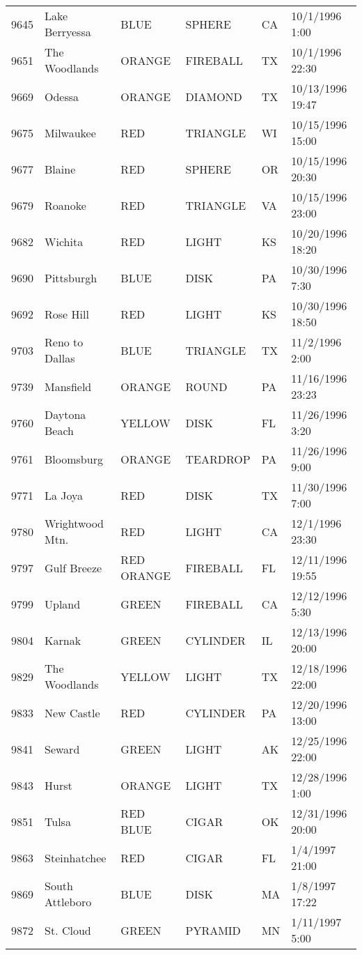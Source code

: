 \begin{tabular}{llllll}
9645 & Lake Berryessa & BLUE & SPHERE & CA & 10/1/1996 1:00 \\
9651 & The Woodlands & ORANGE & FIREBALL & TX & 10/1/1996 22:30 \\
9669 & Odessa & ORANGE & DIAMOND & TX & 10/13/1996 19:47 \\
9675 & Milwaukee & RED & TRIANGLE & WI & 10/15/1996 15:00 \\
9677 & Blaine & RED & SPHERE & OR & 10/15/1996 20:30 \\
9679 & Roanoke & RED & TRIANGLE & VA & 10/15/1996 23:00 \\
9682 & Wichita & RED & LIGHT & KS & 10/20/1996 18:20 \\
9690 & Pittsburgh & BLUE & DISK & PA & 10/30/1996 7:30 \\
9692 & Rose Hill & RED & LIGHT & KS & 10/30/1996 18:50 \\
9703 & Reno to Dallas & BLUE & TRIANGLE & TX & 11/2/1996 2:00 \\
9739 & Mansfield & ORANGE & ROUND & PA & 11/16/1996 23:23 \\
9760 & Daytona Beach & YELLOW & DISK & FL & 11/26/1996 3:20 \\
9761 & Bloomsburg & ORANGE & TEARDROP & PA & 11/26/1996 9:00 \\
9771 & La Joya & RED & DISK & TX & 11/30/1996 7:00 \\
9780 & Wrightwood Mtn. & RED & LIGHT & CA & 12/1/1996 23:30 \\
9797 & Gulf Breeze & RED ORANGE & FIREBALL & FL & 12/11/1996 19:55 \\
9799 & Upland & GREEN & FIREBALL & CA & 12/12/1996 5:30 \\
9804 & Karnak & GREEN & CYLINDER & IL & 12/13/1996 20:00 \\
9829 & The Woodlands & YELLOW & LIGHT & TX & 12/18/1996 22:00 \\
9833 & New Castle & RED & CYLINDER & PA & 12/20/1996 13:00 \\
9841 & Seward & GREEN & LIGHT & AK & 12/25/1996 22:00 \\
9843 & Hurst & ORANGE & LIGHT & TX & 12/28/1996 1:00 \\
9851 & Tulsa & RED BLUE & CIGAR & OK & 12/31/1996 20:00 \\
9863 & Steinhatchee & RED & CIGAR & FL & 1/4/1997 21:00 \\
9869 & South Attleboro & BLUE & DISK & MA & 1/8/1997 17:22 \\
9872 & St. Cloud & GREEN & PYRAMID & MN & 1/11/1997 5:00 \\

\end{tabular}
